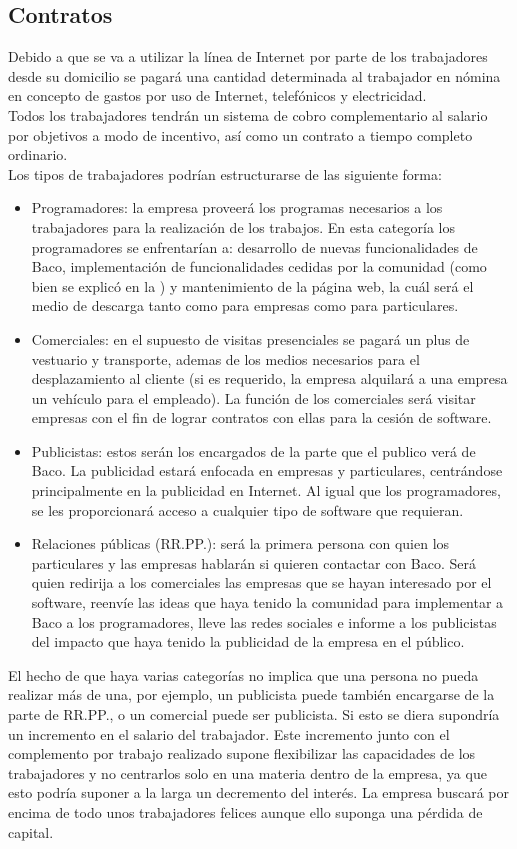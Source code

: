 \documentclass[12pt, a4paper]{book} %
\begin{document}
			\subsection{Contratos}
			Debido a que se va a utilizar la línea de Internet por parte de los trabajadores desde su domicilio se pagará una cantidad determinada al trabajador en nómina en concepto de gastos por uso de Internet, telefónicos y electricidad.\\
			Todos los trabajadores tendrán un sistema de cobro complementario al salario por objetivos a modo de incentivo, así como un contrato a tiempo completo ordinario.\\
			Los tipos de trabajadores podrían estructurarse de las siguiente forma:
			\begin{itemize}
				\item Programadores: la empresa proveerá los programas necesarios a los trabajadores para la realización de los trabajos. En esta categoría los programadores se enfrentarían a: desarrollo de nuevas funcionalidades de Baco, implementación de funcionalidades cedidas por la comunidad (como bien se explicó en la ) y mantenimiento de la página web, la cuál será el medio de descarga tanto como para empresas como para particulares.
				\item Comerciales: en el supuesto de visitas presenciales se pagará un plus de vestuario y transporte, ademas de los medios necesarios para el desplazamiento al cliente (si es requerido, la empresa alquilará a una empresa un vehículo para el empleado). La función de los comerciales será visitar empresas con el fin de lograr contratos con ellas para la cesión de software.
				\item Publicistas: estos serán los encargados de la parte que el publico verá de Baco. La publicidad estará enfocada en empresas y particulares, centrándose principalmente en la publicidad en Internet. Al igual que los programadores, se les proporcionará acceso a cualquier tipo de software que requieran.
				\item Relaciones públicas (RR.PP.): será la primera persona con quien los particulares y las empresas hablarán si quieren contactar con Baco. Será quien redirija a los comerciales las empresas que se hayan interesado por el software, reenvíe las ideas que haya tenido la comunidad para implementar a Baco a los programadores, lleve las redes sociales e informe a los publicistas del impacto que haya tenido la publicidad de la empresa en el público.
			\end{itemize}
			El hecho de que haya varias categorías no implica que una persona no pueda realizar más de una, por ejemplo, un publicista puede también encargarse de la parte de RR.PP., o un comercial puede ser publicista. Si esto se diera supondría un incremento en el salario del trabajador. Este incremento junto con el complemento por trabajo realizado supone flexibilizar las capacidades de los trabajadores y no centrarlos solo en una materia dentro de la empresa, ya que esto podría suponer a la larga un decremento del interés. La empresa buscará por encima de todo unos trabajadores felices aunque ello suponga una pérdida de capital.
\end{document}
